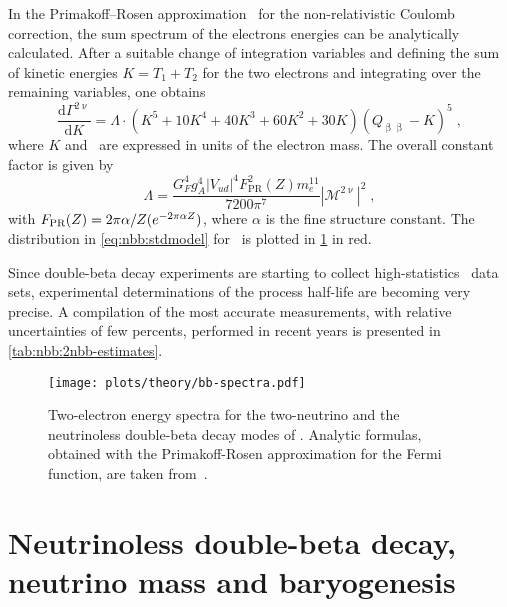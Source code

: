 In the Primakoff–Rosen approximation~\cite{Primakoff1959} for the non-relativistic Coulomb
correction, the sum spectrum of the electrons energies can be analytically calculated.
After a suitable change of integration variables and defining the sum of kinetic energies
$K=T_1+T_2$ for the two electrons and integrating over the remaining variables, one obtains
\begin{equation}\label{eq:nbb:stdmodel}
  \frac{\text{d}\Gamma^{2\upnu}}{\text{d}K} =
  \Lambda \cdot (K^5+10K^4+40K^3+60K^2+30K) {(Q_{\upbeta\upbeta}-K)}^5 \;,
\end{equation}
where $K$ and \qbb\ are expressed in units of the electron mass. The overall constant
factor is given by
\[
  \Lambda = \frac{G_F^4g_A^4|V_{ud}|^4F^2_\text{PR}(Z)m_e^{11}}{7200\pi^7}
            |\mathcal{M}^{2\upnu}|^2 \;,
\]
with $F_\text{PR}(Z) = 2\pi\alpha/Z(\-e^{-2\pi\alpha Z})$, where $\alpha$ is the fine
structure constant. The distribution in \cref{eq:nbb:stdmodel} for \gesix\ is plotted in
\cref{fig:nbb:spectra} in red.

Since double-beta decay experiments are starting to collect high-statistics \nnbb\ data
sets, experimental determinations of the process half-life are becoming very precise. A
compilation of the most accurate measurements, with relative uncertainties of few
percents, performed in recent years is presented in \cref{tab:nbb:2nbb-estimates}.

\begin{figure}
  \centering
  \texttt{[image: plots/theory/bb-spectra.pdf]}
  \caption{%
    Two-electron energy spectra for the two-neutrino and the neutrinoless
    double-beta decay modes of \gesix. Analytic formulas, obtained with the
    Primakoff-Rosen approximation for the Fermi function, are taken
    from~\cite{Tretyak1995, Tretyak2002}.
  }\label{fig:nbb:spectra}
\end{figure}

\begin{table}
  \centering
  \caption{%
    A compilation of the most precise measures of the standard \nnbb\ half-life for a
    selection of double-beta emitters.
  }\label{tab:nbb:2nbb-estimates}
  
\end{table}

\section{Neutrinoless double-beta decay, neutrino mass and baryogenesis}%
\label{sec:nbb:0nbb}

